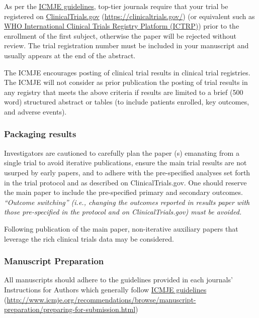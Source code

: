 \documentclass[]{book}
\begin{document}
As per the
\href{http://www.icmje.org/recommendations/browse/manuscript-preparation/preparing-for-submission.html}{ICMJE
guidelines}, top-tier journals require that your trial be registered on
\href{https://clinicaltrials.gov/}{ClinicalTrials.gov}
(\url{https://clinicaltrials.gov/}) (or equivalent such as
\href{http://www.who.int/ictrp/network/primary/en/index.html}{WHO
International Clinical Trials Registry Platform (ICTRP)}) prior to the
enrollment of the first subject, otherwise the paper will be rejected
without review. The trial registration number must be included in your
manuscript and usually appears at the end of the abstract.

The ICMJE encourages posting of clinical trial results in clinical trial
registries. The ICMJE will not consider as prior publication the posting
of trial results in any registry that meets the above criteria if
results are limited to a brief (500 word) structured abstract or tables
(to include patients enrolled, key outcomes, and adverse events).

\subsubsection{Packaging results}\label{packaging-results}

Investigators are cautioned to carefully plan the paper (s) emanating
from a single trial to avoid iterative publications, ensure the main
trial results are not usurped by early papers, and to adhere with the
pre-specified analyses set forth in the trial protocol and as described
on ClinicalTrials.gov. One should reserve the main paper to include the
pre-specified primary and secondary outcomes. \emph{``Outcome
switching'' (i.e., changing the outcomes reported in results paper with
those pre-specified in the protocol and on ClinicalTrials.gov) must be
avoided.}

Following publication of the main paper, non-iterative auxiliary papers
that leverage the rich clinical trials data may be considered.

\subsubsection{Manuscript Preparation}\label{manuscript-preparation}

All manuscripts should adhere to the guidelines provided in each
journals' Instructions for Authors which generally follow
\href{http://www.icmje.org/recommendations/browse/manuscript-preparation/preparing-for-submission.html}{ICMJE
guidelines}
(\url{http://www.icmje.org/recommendations/browse/manuscript-preparation/preparing-for-submission.html})
\end{document}
